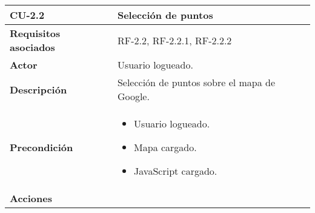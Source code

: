 \begin{longtable}[H]{@{}l|l@{}}
	\toprule
	\begin{minipage}[b]{0.23\columnwidth}\raggedright\strut
		\textbf{CU-2.2}\strut
	\end{minipage} & \begin{minipage}[b]{0.71\columnwidth}\raggedright\strut
		\textbf{Selección de puntos}\strut
	\end{minipage}\tabularnewline
	\toprule
	\endhead
	\begin{minipage}[t]{0.23\columnwidth}\raggedright\strut
		\textbf{Requisitos asociados}\strut
	\end{minipage} & \begin{minipage}[t]{0.71\columnwidth}\raggedright\strut
		RF-2.2, RF-2.2.1, RF-2.2.2\strut
	\end{minipage}\tabularnewline
	\midrule
	\begin{minipage}[t]{0.23\columnwidth}\raggedright\strut
		\textbf{Actor}\strut
	\end{minipage} & \begin{minipage}[t]{0.71\columnwidth}\raggedright\strut
		Usuario logueado.\strut
	\end{minipage}\tabularnewline
	\midrule
	\begin{minipage}[t]{0.23\columnwidth}\raggedright\strut
		\textbf{Descripción}\strut
	\end{minipage} & \begin{minipage}[t]{0.71\columnwidth}\raggedright\strut
		Selección de puntos sobre el mapa de Google.\strut
	\end{minipage}\tabularnewline
	\midrule
	\begin{minipage}[t]{0.23\columnwidth}\raggedright\strut
		\textbf{Precondición}\strut
	\end{minipage} & \begin{minipage}[t]{0.71\columnwidth}\raggedright\strut
		\begin{itemize}
			\item Usuario logueado.
			\item Mapa cargado.
			\item JavaScript cargado.
		\end{itemize}
	\end{minipage}\tabularnewline
	\midrule
	\begin{minipage}[t]{0.23\columnwidth}\raggedright\strut
		\textbf{Acciones}\strut
	\end{minipage} & \begin{minipage}[t]{0.71\columnwidth}\raggedright

\end{minipage}
\end{longtable}
